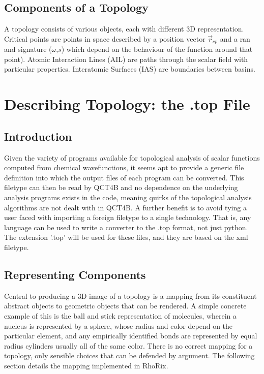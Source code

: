 \documentclass{tufte-book}
\newcommand{\programName}{RhoRix}
\begin{document}
\section{Components of a Topology}

A topology consists of various objects, each with different 3D representation. 
Critical points are points in space described by a position vector $\vec{r}_{cp}$ and a ran and signature ($\omega$,$s$) 
which depend on the behaviour of the function around that point).
Atomic Interaction Lines (AIL) are paths through the scalar field with particular properties.
Interatomic Surfaces (IAS) are boundaries between basins.

\chapter{Describing Topology: the .top File}

\section{Introduction}

Given the variety of programs available for topological analysis of scalar functions computed from chemical 
wavefunctions, it seems apt to provide a generic file definition into which the output files of each program 
can be converted.
This filetype can then be read by QCT4B and no dependence on the underlying analysis programs exists in the code, 
meaning quirks of the topological analysis algorithms are not dealt with in QCT4B.
A further benefit is to avoid tying a user faced with importing a foreign filetype to a single technology.
That is, any language can be used to write a converter to the .top format, not just python.
The extension '.top' will be used for these files, and they are based on the xml filetype.

\section{Representing Components}

Central to producing a 3D image of a topology is a mapping from its constituent abstract objects to geometric objects that can be rendered. A simple concrete example of this is the ball and stick representation of molecules, wherein a nucleus is represented by a sphere, whose radius and color depend on the particular element, and any empirically identified bonds are represented by equal radius cylinders usually all of the same color. 
There is no correct mapping for a topology, only sensible choices that can be defended by argument. The following section details the mapping implemented in \programName{}.
\end{document}
